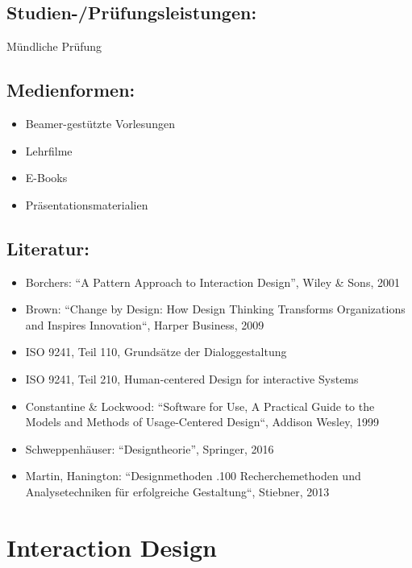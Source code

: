 \section*{Studien-/Prüfungsleistungen:}\label{studien-pruxfcfungsleistungen-10}

Mündliche Prüfung

\section*{Medienformen:}\label{medienformen-10}

\begin{itemize}
\item
  Beamer-gestützte Vorlesungen
\item
  Lehrfilme
\item
  E-Books
\item
  Präsentationsmaterialien
\end{itemize}

\section*{Literatur:}\label{literatur-10}

\begin{itemize}
\item
  Borchers: ``A Pattern Approach to Interaction Design'', Wiley \& Sons,
  2001
\item
  Brown: ``Change by Design: How Design Thinking Transforms
  Organizations and Inspires Innovation``, Harper Business, 2009
\item
  ISO 9241, Teil 110, Grundsätze der Dialoggestaltung
\item
  ISO 9241, Teil 210, Human-centered Design for interactive Systems
\item
  Constantine \& Lockwood: ``Software for Use, A Practical Guide to the
  Models and Methods of Usage-Centered Design``, Addison Wesley, 1999
\item
  Schweppenhäuser: ``Designtheorie'', Springer, 2016
\item
  Martin, Hanington: ``Designmethoden .100 Recherchemethoden und
  Analysetechniken für erfolgreiche Gestaltung``, Stiebner, 2013
\end{itemize}

\chapter{Interaction Design}\label{interaction-design}

